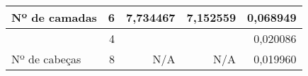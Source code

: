 \begin{table}[]
{\begin{tabular}{lr|rrr}
            \multicolumn{1}{l|}{\multirow{-3}{*}{Nº de camadas}}                                                      & 6                                                                                                                      & \multicolumn{1}{r|}{7,734467}                                                                                         & \multicolumn{1}{r|}{7,152559}                                    & 0,068949                         \\ \hline
            \multicolumn{1}{l|}{}                                                                                     & 4                                                                                                                      & \multicolumn{1}{r|}{}                                                                                                 & \multicolumn{1}{r|}{}                                            & 0,020086                         \\
            \multicolumn{1}{l|}{\multirow{-2}{*}{Nº de cabeças}}                                                      & 8                                                                                                                      & \multicolumn{1}{r|}{\multirow{-2}{*}{N/A}}                                                                            & \multicolumn{1}{r|}{\multirow{-2}{*}{N/A}}                       & \cellcolor[HTML]{FFF5E1}0,019960 \\ \hline
        \end{tabular}%
    }
    \nomefonte{}
\end{table}